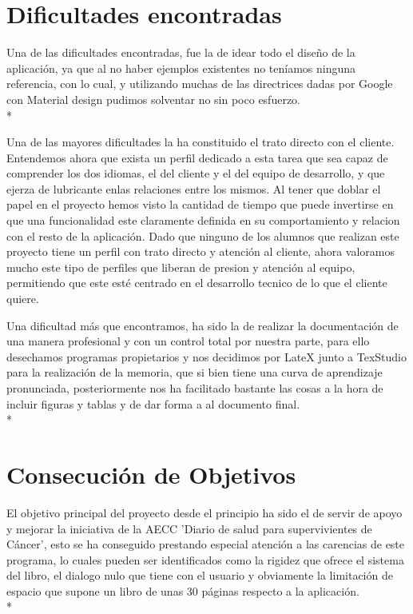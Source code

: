 \documentclass[../pfc.tex]{subfiles}
\begin{document}
	

	\section{Dificultades encontradas}
	
	Una de las dificultades encontradas, fue la de idear todo el diseño de la aplicación, ya que al no haber ejemplos existentes no teníamos ninguna referencia, con lo cual, y utilizando muchas de las directrices dadas por Google con Material design pudimos solventar no sin poco esfuerzo.\\*

	Una de las mayores dificultades la ha constituido el trato directo con el cliente. Entendemos ahora que exista un perfil dedicado a esta tarea que sea capaz de comprender los dos idiomas, el del cliente y el del equipo de desarrollo, y que ejerza de lubricante enlas relaciones entre los mismos. Al tener que doblar el papel en el proyecto hemos visto la cantidad de tiempo que puede invertirse en que una funcionalidad este claramente definida en su comportamiento y relacion con el resto de la aplicación. Dado que ninguno de los alumnos que realizan este proyecto tiene un perfil con trato directo y atención al cliente, ahora valoramos mucho este tipo de perfiles que liberan de presion y atención al equipo, permitiendo que este esté centrado en el desarrollo tecnico de lo que el cliente quiere. 		
	 
	Una dificultad más que encontramos, ha sido la de realizar la documentación de una manera profesional y con un control total por nuestra parte, para ello desechamos programas propietarios y nos decidimos por LateX\cite{sharelatex} junto a TexStudio\cite{texstudio} para la realización de la memoria, que si bien tiene una curva de aprendizaje pronunciada, posteriormente nos ha facilitado bastante las cosas a la hora de incluir figuras y tablas y de dar forma a al documento final.\\*
	
		
	\section{Consecución de Objetivos}
	
	El objetivo principal del proyecto desde el principio ha sido el de servir de apoyo y mejorar la iniciativa de la AECC 'Diario de salud para supervivientes de Cáncer', esto se ha conseguido prestando especial atención a las carencias de este programa, lo cuales pueden ser identificados como la rigidez que ofrece el sistema del libro, el dialogo nulo que tiene con el usuario y obviamente la limitación de espacio que supone un libro de unas 30 páginas respecto a la aplicación.\\*
	
\end{document}
